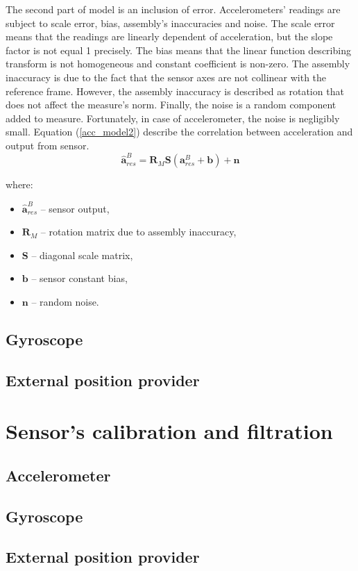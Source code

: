 The second part of model is an inclusion of error. Accelerometers' readings are subject to scale error, bias, assembly's inaccuracies and noise.
The scale error means that the readings are linearly dependent of acceleration, but the slope factor is not equal 1 precisely. The bias means that the linear function describing transform is not homogeneous and constant coefficient is non-zero. The assembly inaccuracy is due to the fact that the sensor axes are not collinear with the reference frame. However, the assembly inaccuracy is described as rotation that does not affect the measure's norm. Finally, the noise is a random component added to measure. Fortunately, in case of accelerometer, the noise is negligibly small. Equation (\ref{acc_model2}) describe the correlation between acceleration and output from sensor.\\


\begin{equation}
	\bm{\hat{a}}_{res}^B = \bm{R}_M \bm{S} \left( \bm{a}_{res}^B + \bm{b} \right) + \bm{n}
	\label{acc_model2}
\end{equation}

where:
\begin{itemize}
	\item $\bm{\hat{a}}_{res}^B$ -- sensor output,
	\item $\bm{R}_M$ -- rotation matrix due to assembly inaccuracy,
	\item $\bm{S}$ -- diagonal scale matrix,
	\item $\bm{b}$ -- sensor constant bias,
	\item $\bm{n}$ -- random noise.	
\end{itemize}



\subsection{Gyroscope}

\subsection{External position provider}

\section{Sensor's calibration and filtration}

\subsection{Accelerometer}


\subsection{Gyroscope}


\subsection{External position provider}


